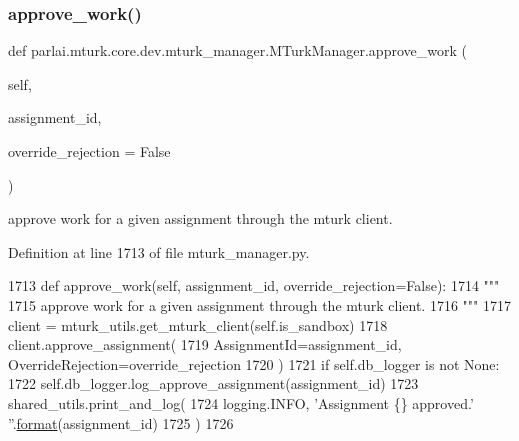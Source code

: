 \subsubsection{\texorpdfstring{approve\+\_\+work()}{approve\_work()}}
{\footnotesize\ttfamily def parlai.\+mturk.\+core.\+dev.\+mturk\+\_\+manager.\+M\+Turk\+Manager.\+approve\+\_\+work (\begin{DoxyParamCaption}\item[{}]{self,  }\item[{}]{assignment\+\_\+id,  }\item[{}]{override\+\_\+rejection = {\ttfamily False} }\end{DoxyParamCaption})}

\begin{DoxyVerb}approve work for a given assignment through the mturk client.
\end{DoxyVerb}
 

Definition at line 1713 of file mturk\+\_\+manager.\+py.


\begin{DoxyCode}
1713     \textcolor{keyword}{def }approve\_work(self, assignment\_id, override\_rejection=False):
1714         \textcolor{stringliteral}{"""}
1715 \textcolor{stringliteral}{        approve work for a given assignment through the mturk client.}
1716 \textcolor{stringliteral}{        """}
1717         client = mturk\_utils.get\_mturk\_client(self.is\_sandbox)
1718         client.approve\_assignment(
1719             AssignmentId=assignment\_id, OverrideRejection=override\_rejection
1720         )
1721         \textcolor{keywordflow}{if} self.db\_logger \textcolor{keywordflow}{is} \textcolor{keywordflow}{not} \textcolor{keywordtype}{None}:
1722             self.db\_logger.log\_approve\_assignment(assignment\_id)
1723         shared\_utils.print\_and\_log(
1724             logging.INFO, \textcolor{stringliteral}{'Assignment \{\} approved.'} \textcolor{stringliteral}{''}.\hyperlink{namespaceparlai_1_1chat__service_1_1services_1_1messenger_1_1shared__utils_a32e2e2022b824fbaf80c747160b52a76}{format}(assignment\_id)
1725         )
1726 
\end{DoxyCode}
\mbox{\label{classparlai_1_1mturk_1_1core_1_1dev_1_1mturk__manager_1_1MTurkManager_a615892361c61bb0010f5c4902fc81ff8}} 
